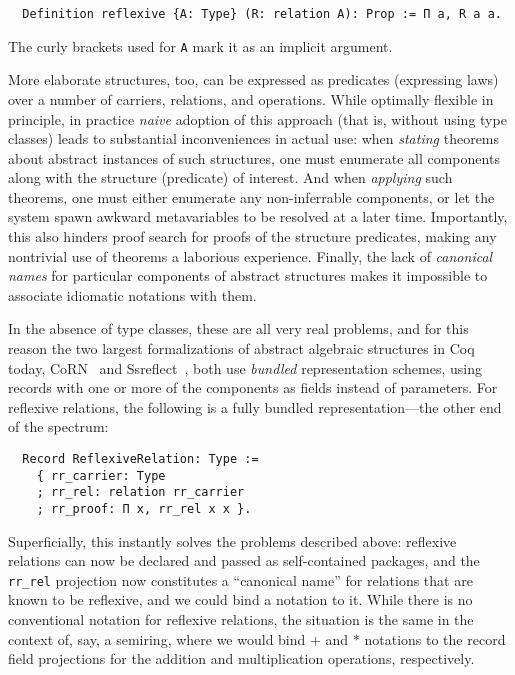 \documentclass[a4paper,10pt,runningheads]{llncs}
\begin{document}
\begin{lstlisting}
  Definition reflexive {A: Type} (R: relation A): Prop := Π a, R a a.
\end{lstlisting}
The curly brackets used for \lstinline|A| mark it as an implicit argument.

More elaborate structures, too, can be expressed as predicates (expressing laws) over a number of carriers, relations, and operations. While optimally flexible in principle, in practice \emph{naive} adoption of this approach (that is, without using type classes) leads to substantial inconveniences in actual use: when \emph{stating} theorems about abstract instances of such structures, one must enumerate all components along with the structure (predicate) of interest. And when \emph{applying} such theorems, one must either enumerate any non-inferrable components, or let the system spawn awkward metavariables to be resolved at a later time. Importantly, this also hinders proof search for proofs of the structure predicates, making any nontrivial use of theorems a laborious experience. Finally, the lack of \emph{canonical names} for particular components of abstract structures makes it impossible to associate idiomatic notations with them.


In the absence of type classes, these are all very real problems, and for this reason the two largest formalizations of abstract algebraic structures in Coq today, CoRN~\cite{C-corn} and Ssreflect~\cite{Packed}, both use \emph{bundled} representation schemes, using records with one or more of the components as fields instead of parameters. For reflexive relations, the following is a fully bundled representation---the other end of the spectrum:
\begin{lstlisting}
  Record ReflexiveRelation: Type :=
    { rr_carrier: Type
    ; rr_rel: relation rr_carrier
    ; rr_proof: Π x, rr_rel x x }.
\end{lstlisting}
Superficially, this instantly solves the problems described above: reflexive relations can now be declared and passed as self-contained packages, and the \lstinline|rr_rel| projection now constitutes a ``canonical name'' for relations that are known to be reflexive, and we could bind a notation to it. While there is no conventional notation for reflexive relations, the situation is the same in the context of, say, a semiring, where we would bind $+$ and $*$ notations to the record field projections for the addition and multiplication operations, respectively.
\end{document}
